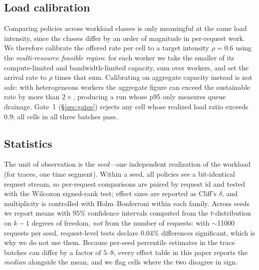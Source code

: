 \subsection{Load calibration}
Comparing policies across workload classes is only meaningful at the same load intensity, since
the classes differ by an order of magnitude in per-request work. We therefore calibrate the
offered rate per cell to a target intensity $\rho = 0.6$ using the \emph{multi-resource feasible
region}: for each worker we take the smaller of its compute-limited and bandwidth-limited
capacity, sum over workers, and set the arrival rate to $\rho$ times that sum. Calibrating on
aggregate capacity instead is not safe: with heterogeneous workers the aggregate figure can
exceed the sustainable rate by more than $2\times$, producing a run whose p95 only measures queue
drainage. Gate~1 (\S\ref{sec:gates}) rejects any cell whose realized load ratio exceeds $0.9$;
all cells in all three batches pass.

\subsection{Statistics}
The unit of observation is the \emph{seed}---one independent realization of the workload (for
traces, one time segment). Within a seed, all policies see a bit-identical request stream, so
per-request comparisons are paired by request id and tested with the Wilcoxon signed-rank test;
effect sizes are reported as Cliff's $\delta$, and multiplicity is controlled with
Holm--Bonferroni within each family. Across seeds we report means with $95\%$ confidence
intervals computed from the $t$-distribution on $k-1$ degrees of freedom, \emph{not} from the
number of requests: with $\sim$11000 requests per seed, request-level tests declare
$0.04\%$ differences significant, which is why we do not use them. Because per-seed percentile
estimates in the trace batches can differ by a factor of $5$--$8$, every effect table in this
paper reports the \emph{median} alongside the mean, and we flag cells where the two disagree in
sign.

